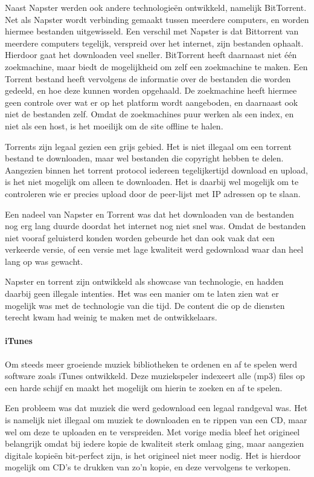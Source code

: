 Naast Napster werden ook andere technologieën ontwikkeld, namelijk BitTorrent. Net als Napster wordt verbinding gemaakt tussen meerdere computers, en worden hiermee bestanden uitgewisseld. Een verschil met Napster is dat Bittorrent van meerdere computers tegelijk, verspreid over het internet, zijn bestanden ophaalt. Hierdoor gaat het downloaden veel sneller. BitTorrent heeft daarnaast niet één zoekmachine, maar biedt de mogelijkheid om zelf een zoekmachine te maken. Een Torrent bestand heeft vervolgens de informatie over de bestanden die worden gedeeld, en hoe deze kunnen worden opgehaald. De zoekmachine heeft hiermee geen controle over wat er op het platform wordt aangeboden, en daarnaast ook niet de bestanden zelf. Omdat de zoekmachines puur werken als een index, en niet als een host, is het moeilijk om de site offline te halen.

Torrents zijn legaal gezien een grijs gebied. Het is niet illegaal om een torrent bestand te downloaden, maar wel bestanden die copyright hebben te delen. Aangezien binnen het torrent protocol iedereen tegelijkertijd download en upload, is het niet mogelijk om alleen te downloaden. Het is daarbij wel mogelijk om te controleren wie er precies upload door de peer-lijst met IP adressen op te slaan.

Een nadeel van Napster en Torrent was dat het downloaden van de bestanden nog erg lang duurde doordat het internet nog niet snel was. Omdat de bestanden niet vooraf geluisterd konden worden gebeurde het dan ook vaak dat een verkeerde versie, of een versie met lage kwaliteit werd gedownload waar dan heel lang op was gewacht.

Napster en torrent zijn ontwikkeld als showcase van technologie, en hadden daarbij geen illegale intenties. Het was een manier om te laten zien wat er mogelijk was met de technologie van die tijd. De content die op de diensten terecht kwam had weinig te maken met de ontwikkelaars.

\paragraph*{iTunes}
Om  steeds meer groeiende muziek bibliotheken te ordenen en af te spelen werd software zoals iTunes ontwikkeld. Deze muziekspeler indexeert alle (mp3) files op een harde schijf en maakt het mogelijk om hierin te zoeken en af te spelen.

Een probleem was dat muziek die werd gedownload een legaal randgeval was. Het is namelijk niet illegaal om muziek te downloaden en te rippen van een CD, maar wel om deze te uploaden en te verspreiden. Met vorige media bleef het origineel belangrijk omdat bij iedere kopie de kwaliteit sterk omlaag ging, maar aangezien digitale kopieën bit-perfect zijn, is het origineel niet meer nodig. Het is hierdoor mogelijk om CD's te drukken van zo'n kopie, en deze vervolgens te verkopen.

